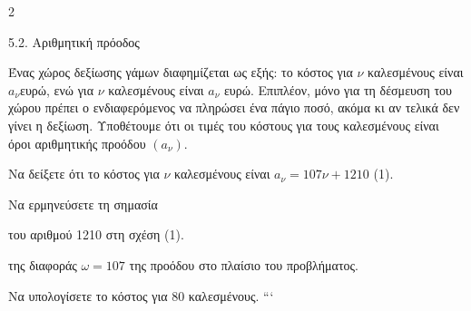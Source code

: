 \begin{ylh}{2}
    \item 5.2. Αριθμητική πρόοδος
\end{ylh}
Ένας χώρος δεξίωσης γάμων διαφημίζεται ως εξής: το κόστος για $\nu$ καλεσμένους είναι $a_\nu$ευρώ, ενώ για $\nu$ καλεσμένους είναι $a_\nu$ ευρώ. Επιπλέον, μόνο για τη δέσμευση του χώρου πρέπει ο ενδιαφερόμενος να πληρώσει ένα πάγιο ποσό, ακόμα κι αν τελικά δεν γίνει η δεξίωση. Υποθέτουμε ότι οι τιμές του κόστους για τους καλεσμένους είναι όροι αριθμητικής προόδου $(a_\nu)$.

\begin{alist}
\item Να δείξετε ότι το κόστος για $\nu$ καλεσμένους είναι $a_\nu = 107\nu + 1210$ (1). 
\item Να ερμηνεύσετε τη σημασία
\begin{rlist}
\item του αριθμού 1210 στη σχέση (1). 
\item της διαφοράς $\omega = 107$ της προόδου στο πλαίσιο του προβλήματος. 
\end{rlist}
\item Να υπολογίσετε το κόστος για 80 καλεσμένους. 
```
\end{alist}

